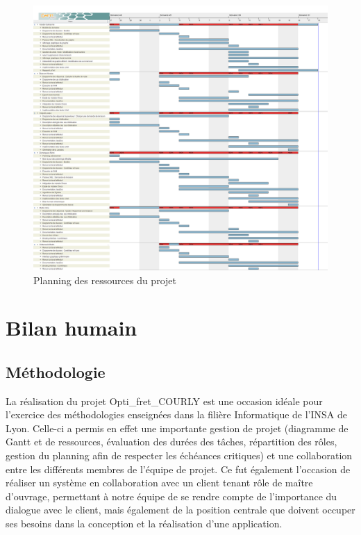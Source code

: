 \begin{landscape}
\begin{figure}[h]
    \centering
    \includegraphics[width=180mm]{../diagrams/project_management/planning_effectif/planning_ressources.png}
    \caption{Planning des ressources du projet}
    \label{diagram:planning_ressource}
\end{figure}
\end{landscape}
\pagebreak


\section{Bilan humain}
\subsection{Méthodologie}
La réalisation du projet Opti\_fret\_COURLY est une occasion idéale pour l’exercice des méthodologies enseignées dans la filière Informatique de l’INSA de Lyon. Celle-ci a permis en effet une importante gestion de projet (diagramme de Gantt et de ressources, évaluation des durées des tâches, répartition des rôles, gestion du planning afin de respecter les échéances critiques) et une collaboration entre les différents membres de l’équipe de projet. Ce fut également l’occasion de réaliser un système en collaboration avec un client tenant rôle de maître d’ouvrage, permettant à notre équipe de se rendre compte de l’importance du dialogue avec le client, mais également de la position centrale que doivent occuper ses besoins dans la conception et la réalisation d’une application.

